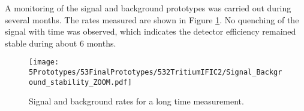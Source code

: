 



A monitoring of the signal and background prototypes was carried out during several months. The rates measured are shown in Figure \ref{fig:MonitorizationTRITIUMIFIC2}. No quenching of the signal with time was observed, which indicates the detector efficiency remained stable during about 6 months. 

\begin{figure}[h]
\centering
\texttt{[image: 5Prototypes/53FinalPrototypes/532TritiumIFIC2/Signal\_Background\_stability\_ZOOM.pdf]}
\caption{Signal and background rates for a long time measurement.\label{fig:MonitorizationTRITIUMIFIC2}}
\end{figure}

